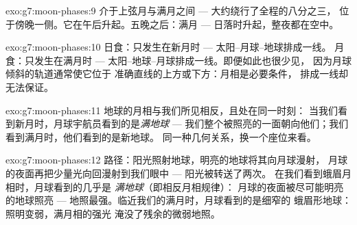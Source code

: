 \begin{solution}{exo:g7:moon-phases:9}
介于上弦月与满月之间 --- 大约绕行了全程的八分之三，
位于傍晚一侧。它在午后升起。五晚之后：满月 ---
日落时升起，整夜都在空中。
\end{solution}

\begin{solution}{exo:g7:moon-phases:10}
日食：只发生在新月时 --- 太阳--月球--地球排成一线。
月食：只发生在满月时 --- 太阳--地球--月球排成一线。即便如此也很少见，
因为月球倾斜的轨道通常使它位于
准确直线的上方或下方：月相是必要条件，
排成一线却无法保证。
\end{solution}

\begin{solution}{exo:g7:moon-phases:11}
地球的月相与我们所见相反，且处在同一时刻：
当我们看到新月时，月球宇航员看到的是\emph{满地球} ---
我们整个被照亮的一面朝向他们；我们看到满月时，他们看到的是新地球。
同一种几何关系，换一个座位来看。
\end{solution}

\begin{solution}{exo:g7:moon-phases:12}
路径：阳光照射地球，明亮的地球将其向月球漫射，
月球的夜面再把少量光向回漫射到我们眼中 --- 阳光被转送了两次。
在我们看到蛾眉月相时，月球看到的几乎是
\emph{满地球}（即相反月相规律）：
月球的夜面被尽可能明亮的地球照亮 ---
地照最强。临近我们的满月时，月球看到的是细窄的
蛾眉形地球：照明变弱，满月相的强光
淹没了残余的微弱地照。
\end{solution}


